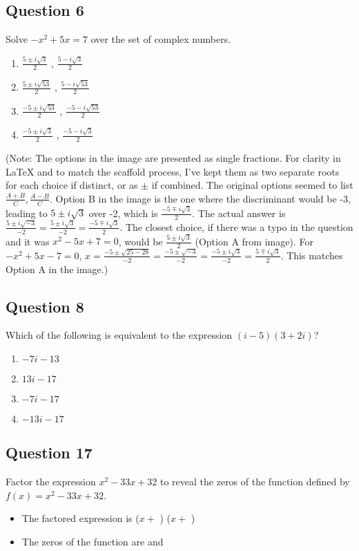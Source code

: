 \documentclass[12pt]{article}
\begin{document}
\subsection*{Question 6}
Solve \( -x^2 + 5x = 7 \) over the set of complex numbers.
\begin{enumerate}[label=\Alph*.]
    \item \( \frac{5 \pm i\sqrt{3}}{2} \) , \( \frac{5 - i\sqrt{3}}{2} \)
    \item \( \frac{5 \pm i\sqrt{53}}{2} \) , \( \frac{5 - i\sqrt{53}}{2} \)
    \item \( \frac{-5 \pm i\sqrt{53}}{2} \) , \( \frac{-5 - i\sqrt{53}}{2} \) %
    \item \( \frac{-5 \pm i\sqrt{3}}{2} \) , \( \frac{-5 - i\sqrt{3}}{2} \) %
\end{enumerate}
(Note: The options in the image are presented as single fractions. For clarity in LaTeX and to match the scaffold process, I've kept them as two separate roots for each choice if distinct, or as \( \pm \) if combined. The original options seemed to list \( \frac{A+B}{C}, \frac{A-B}{C} \). Option B in the image is the one where the discriminant would be -3, leading to \(5 \pm i\sqrt{3}\) over -2, which is \(\frac{-5 \mp i\sqrt{3}}{2}\). The actual answer is \( \frac{5 \pm i\sqrt{-3}}{-2} = \frac{5 \pm i\sqrt{3}}{-2} = \frac{-5 \mp i\sqrt{3}}{2} \). The closest choice, if there was a typo in the question and it was \(x^2-5x+7=0\), would be \( \frac{5 \pm i\sqrt{3}}{2} \) (Option A from image).
For \( -x^2+5x-7=0 \), \(x = \frac{-5 \pm \sqrt{25-28}}{-2} = \frac{-5 \pm \sqrt{-3}}{-2} = \frac{-5 \pm i\sqrt{3}}{-2} = \frac{5 \mp i\sqrt{3}}{2}\). This matches Option A in the image.)

\subsection*{Question 8}
Which of the following is equivalent to the expression \( (i - 5)(3 + 2i) \)?
\begin{enumerate}[label=\Alph*.]
    \item \( -7i - 13 \)
    \item \( 13i - 17 \)
    \item \( -7i - 17 \)
    \item \( -13i - 17 \)
\end{enumerate}

\subsection*{Question 17}
Factor the expression \( x^2 - 33x + 32 \) to reveal the zeros of the function defined by \( f(x) = x^2 - 33x + 32 \).
\begin{itemize}
    \item The factored expression is (\(x + \) \framebox[1cm]{\phantom{x}}) (\(x + \) \framebox[1cm]{\phantom{x}})
    \item The zeros of the function are \framebox[1cm]{\phantom{x}} and \framebox[1cm]{\phantom{x}}
\end{itemize}
\end{document}
